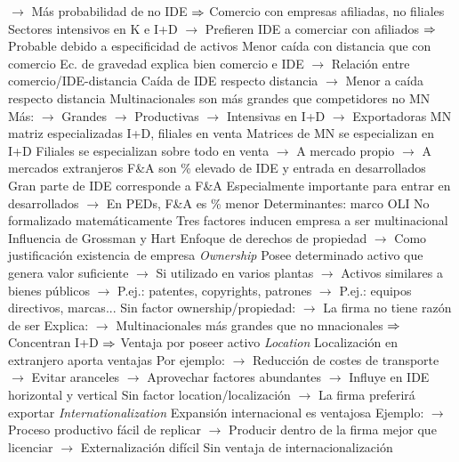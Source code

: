 \documentclass{nuevotema}
\begin{document}
\begin{esquemal}
				\4[] $\to$ Más probabilidad de no IDE
				\4[] $\Rightarrow$ Comercio con empresas afiliadas, no filiales
				\4[] Sectores intensivos en K e I+D
				\4[] $\to$ Prefieren IDE a comerciar con afiliados
				\4[] $\Rightarrow$ Probable debido a especificidad de activos
				\4[iii] Menor caída con distancia que con comercio
				\4[] Ec. de gravedad explica bien comercio e IDE
				\4[] $\to$ Relación entre comercio/IDE-distancia
				\4[] Caída de IDE respecto distancia
				\4[] $\to$ Menor a caída respecto distancia
				\4[iv] Multinacionales son más grandes que competidores no MN
				\4[] Más:
				\4[] $\to$ Grandes
				\4[] $\to$ Productivas
				\4[] $\to$ Intensivas en I+D
				\4[] $\to$ Exportadoras
				\4[v] MN matriz especializadas I+D, filiales en venta
				\4[] Matrices de MN se especializan en I+D
				\4[] Filiales se especializan sobre todo en venta
				\4[] $\to$ A mercado propio
				\4[] $\to$ A mercados extranjeros
				\4[vi] F\&A son \% elevado de IDE y entrada en desarrollados
				\4[] Gran parte de IDE corresponde a F\&A
				\4[] Especialmente importante para entrar en desarrollados
				\4[] $\to$ En PEDs, F\&A es \% menor
			\3 Determinantes: marco OLI
				\4 No formalizado matemáticamente
				\4 Tres factores inducen empresa a ser multinacional
				\4 Influencia de Grossman y Hart
				\4[] Enfoque de derechos de propiedad
				\4[] $\to$ Como justificación existencia de empresa
				\4[]
				\4[] \textit{Ownership}
				\4 Posee determinado activo que genera valor suficiente
				\4[] $\to$ Si utilizado en varios plantas
				\4[] $\to$ Activos similares a bienes públicos
				\4[] $\to$ P.ej.: patentes, copyrights, patrones
				\4[] $\to$ P.ej.: equipos directivos, marcas...
				\4 Sin factor ownership/propiedad:
				\4[] $\to$ La firma no tiene razón de ser
				\4 Explica:
				\4[] $\to$ Multinacionales más grandes que no mnacionales
				\4[] $\Rightarrow$ Concentran I+D
				\4[] $\Rightarrow$ Ventaja por poseer activo
				\4[] \textit{Location}
				\4 Localización en extranjero aporta ventajas
				\4[] Por ejemplo:
				\4[] $\to$ Reducción de costes de transporte
				\4[] $\to$ Evitar aranceles
				\4[] $\to$ Aprovechar factores abundantes
				\4[] $\to$ Influye en IDE horizontal y vertical
				\4 Sin factor location/localización
				\4[] $\to$ La firma preferirá exportar
				\4[] \textit{Internationalization}
				\4 Expansión internacional es ventajosa
				\4[] Ejemplo:
				\4[] $\to$ Proceso productivo fácil de replicar
				\4[] $\to$ Producir dentro de la firma mejor que licenciar
				\4[] $\to$ Externalización difícil
				\4 Sin ventaja de internacionalización

\end{esquemal}
\end{document}
